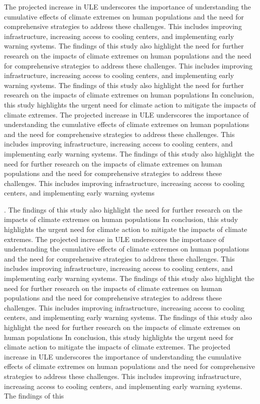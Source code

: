 \documentclass[9pt, twoside, twocolumn]{extarticle}
\begin{document}
The projected increase in ULE underscores the importance of understanding the cumulative effects of climate extremes on human populations and the need for comprehensive strategies to address these challenges. This includes improving infrastructure, increasing access to cooling centers, and implementing early warning systems.\cite{IPCC2021} The findings of this study also highlight the need for further research on the impacts of climate extremes on human populations and the need for comprehensive strategies to address these challenges. This includes improving infrastructure, increasing access to cooling centers, and implementing early warning systems.\cite{IPCC2021} The findings of this study also highlight the need for further research on the impacts of climate extremes on human populations  In conclusion, this study highlights the urgent need for climate action to mitigate the impacts of climate extremes. The projected increase in ULE underscores the importance of understanding the cumulative effects of climate extremes on human populations and the need for comprehensive strategies to address these challenges. This includes improving infrastructure, increasing access to cooling centers, and implementing early warning systems.\cite{IPCC2021} The findings of this study also highlight the need for further research on the impacts of climate extremes on human populations and the need for comprehensive strategies to address these challenges. This includes improving infrastructure, increasing access to cooling centers, and implementing early warning systems



.\cite{IPCC2021} The findings of this study also highlight the need for further research on the impacts of climate extremes on human populations  In conclusion, this study highlights the urgent need for climate action to mitigate the impacts of climate extremes. The projected increase in ULE underscores the importance of understanding the cumulative effects of climate extremes on human populations and the need for comprehensive strategies to address these challenges. This includes improving infrastructure, increasing access to cooling centers, and implementing early warning systems.\cite{IPCC2021} The findings of this study also highlight the need for further research on the impacts of climate extremes on human populations and the need for comprehensive strategies to address these challenges. This includes improving infrastructure, increasing access to cooling centers, and implementing early warning systems.\cite{IPCC2021} The findings of this study also highlight the need for further research on the impacts of climate extremes on human populations  In conclusion, this study highlights the urgent need for climate action to mitigate the impacts of climate extremes. The projected increase in ULE underscores the importance of understanding the cumulative effects of climate extremes on human populations and the need for comprehensive strategies to address these challenges. This includes improving infrastructure, increasing access to cooling centers, and implementing early warning systems.\cite{IPCC2021} The findings of this 
\end{document}
